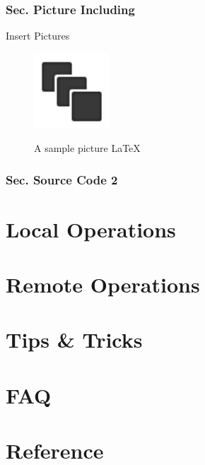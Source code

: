 ﻿\documentclass{beamer}
\begin{document}
\section[Sec. Picture Including]{Sec. Picture Including}
\begin{frame}{Insert Pictures}
\begin{figure}[htbp]
  \centering
  \includegraphics[width=80pt]{sample.png}\\
  \caption{A sample picture \LaTeX}
  \label{fig:sample}
\end{figure}
\end{frame}

\section[Sec. Source Code 2]{Sec. Source Code 2}
\begin{frame}
  
\end{frame}


\part[Local Operations]{Local Operations}
\begin{frame}
\end{frame}

\part[Remote Operations]{Remote Operations}
\begin{frame}
\end{frame}

\part[Tips \& Tricks]{Tips \& Tricks}
\begin{frame}
\end{frame}

\part[FAQ]{FAQ}
\begin{frame}
\end{frame}

\part[Reference]{Reference}
\end{document}
